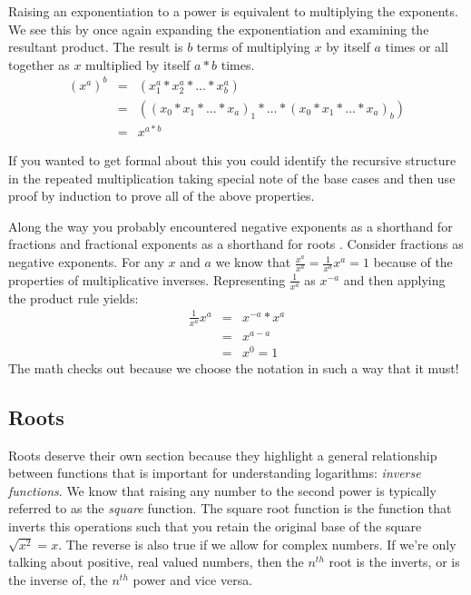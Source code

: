 \documentclass[nobib]{tufte-handout}
\begin{document}
Raising an exponentiation to a power is equivalent to multiplying the exponents. We see this by once again expanding the exponentiation and examining the resultant product. The result is $b$ terms of multiplying $x$ by itself $a$ times or all together as $x$ multiplied by itself $a*b$ times.
\begin{equation}
  \begin{array}{rcl}
    {(x^a)}^b &=& (x^a_1*x^a_2*\ldots*x^a_b) \\
     &=& ({(x_0*x_1*\ldots*x_a)}_1 * \ldots * {(x_0*x_1*\ldots*x_a)}_b) \\
     &=& x^{a*b}
  \end{array}
\end{equation}

If you wanted to get formal about this you could identify the recursive structure in the repeated multiplication taking special note of the base cases and then use proof by induction to prove all of the above properties.

Along the way you probably encountered negative exponents as a shorthand for fractions  and fractional exponents as a shorthand for roots . Consider fractions as negative exponents. For any $x$ and $a$ we know that $\frac{x^a}{x^a}=\frac{1}{x^a}x^a=1$ because of the properties of multiplicative inverses. Representing $\frac{1}{x^a}$ as $x^{-a}$ and then applying the product rule yields:
\begin{equation}
  \begin{array}{rcl}
    \frac{1}{x^a}x^a &=&  x^{-a} * x^a \\
     &=& x^{a-a} \\
     &=& x^0 = 1
  \end{array}
\end{equation}
The math checks out because we choose the notation in such a way that it must!

\subsection{Roots}

Roots deserve their own section because they highlight a general relationship between functions that is important for understanding logarithms: \textit{inverse functions}.  We know that raising any number to the second power is typically referred to as the \textit{square} function. The square root function is the function that inverts this operations such that you retain the original base of the square $\sqrt{x^2} = x$.  The reverse is also true if we allow for complex numbers. If we're only talking about positive, real valued numbers, then the $n^{th}$ root\sidenote{$\sqrt[n]{}$} is the inverts, or is the inverse of, the $n^{th}$ power and vice versa.
\end{document}
